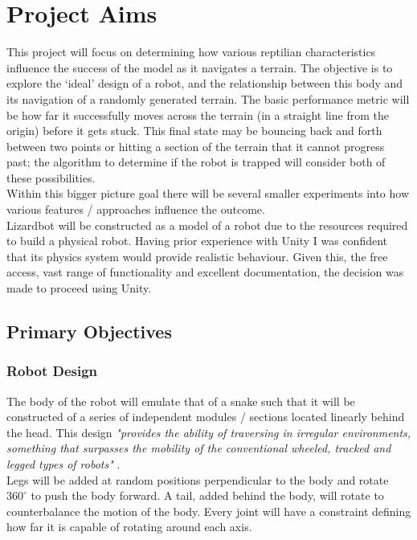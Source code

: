 \documentclass{article}
\begin{document}
\section{Project Aims}
\label{sec:Project Aims}
This project will focus on determining how various reptilian characteristics influence the success of the model as it navigates a terrain. The objective is to explore the ‘ideal’ design of a robot, and the relationship between this body and its navigation of a randomly generated terrain. The basic performance metric will be how far it successfully moves across the terrain (in a straight line from the origin) before it gets stuck. This final state may be bouncing back and forth between two points or hitting a section of the terrain that it cannot progress past; the algorithm to determine if the robot is trapped will consider both of these possibilities. \\
Within this bigger picture goal there will be several smaller experiments into how various features / approaches influence the outcome. \\

Lizardbot will be constructed as a model of a robot due to the resources required to build a physical robot. Having prior experience with Unity  I was confident that its physics system would provide realistic behaviour. Given this, the free access, vast range of functionality and excellent documentation, the decision was made to proceed using Unity. \\

\subsection{Primary Objectives}
\label{sec:Primary Objectives}
\subsubsection{Robot Design}
\label{sec:Robot Design}
The body of the robot will emulate that of a snake such that it will be constructed of a series of independent modules / sections located linearly behind the head. This design \textit{"provides the ability of traversing in irregular environments, something that surpasses the mobility of the conventional wheeled, tracked and legged types of robots"} .\\
Legs will be added at random positions perpendicular to the body and rotate $360^\circ$ to push the body forward. A tail, added behind the body, will rotate to counterbalance the motion of the body. Every joint will have a constraint defining how far it is capable of rotating around each axis. \\
\end{document}
